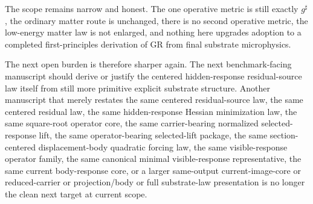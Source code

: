 \documentclass[11pt]{article}
\newcommand{\CompletedMetric}{g^{\sharp}}
\begin{document}
The scope remains narrow and honest. The one operative metric is still exactly \(\CompletedMetric\), the ordinary matter route is unchanged, there is no second operative metric, the low-energy matter law is not enlarged, and nothing here upgrades adoption to a completed first-principles derivation of GR from final substrate microphysics.

The next open burden is therefore sharper again. The next benchmark-facing manuscript should derive or justify the centered hidden-response residual-source law itself from still more primitive explicit substrate structure. Another manuscript that merely restates the same centered residual-source law, the same centered residual law, the same hidden-response Hessian minimization law, the same square-root operator core, the same carrier-bearing normalized selected-response lift, the same operator-bearing selected-lift package, the same section-centered displacement-body quadratic forcing law, the same visible-response operator family, the same canonical minimal visible-response representative, the same current body-response core, or a larger same-output current-image-core or reduced-carrier or projection/body or full substrate-law presentation is no longer the clean next target at current scope.
\end{document}
